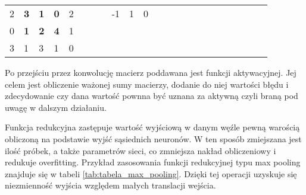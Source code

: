 \begin{table}[h]
{\begin{tabular}{lllllllllllllllllllllll}
\multicolumn{1}{|l|}{2} & \multicolumn{1}{l|}{\textbf{3}} & \multicolumn{1}{l|}{\textbf{1}} & \multicolumn{1}{l|}{\textbf{0}} & \multicolumn{1}{l|}{2} &  &  & \multicolumn{1}{l|}{} & \multicolumn{1}{l|}{-1} & \multicolumn{1}{l|}{1}  & \multicolumn{1}{l|}{0}  &  &  &                       &                         &                        &  &  &                       &                        &                         &  &  \\ \cline{1-5} \cline{9-11}
\multicolumn{1}{|l|}{0} & \multicolumn{1}{l|}{\textbf{1}} & \multicolumn{1}{l|}{\textbf{2}} & \multicolumn{1}{l|}{\textbf{4}} & \multicolumn{1}{l|}{1} &  &  &                       &                         &                         &                         &  &  &                       &                         &                        &  &  &                       &                        &                         &  &  \\ \cline{1-5}
\multicolumn{1}{|l|}{3} & \multicolumn{1}{l|}{1}          & \multicolumn{1}{l|}{3}          & \multicolumn{1}{l|}{1}          & \multicolumn{1}{l|}{0} &  &  &                       &                         &                         &                         &  &  &                       &                         &                        &  &  &                       &                        &                         &  &  \\ \cline{1-5}
\end{tabular}%
}
\label{tab:tabela_filtry_konwolucyjne}
\end{table}


Po przejściu przez konwolucję macierz poddawana jest funkcji aktywacyjnej. Jej celem jest obliczenie ważonej sumy macierzy, dodanie do niej wartości błędu i zdecydowanie czy dana wartość pownna być uznana za aktywną czyli braną pod uwagę w dalszym działaniu.

Funkcja redukcyjna zastępuje wartość wyjściową w danym węźle pewną warością obliczoną na podstawie wyjść sąsiednich neuronów. W ten sposób zmiejszana jest ilość próbek, a także parametrów sieci, co zmniejsza nakład obliczeniowy i redukuje overfitting. Przykład zasosowania funkcji redukcyjnej typu max pooling znajduje się w tabeli \ref{tab:tabela_max_pooling}. Dzięki tej operacji uzyskuje się niezmienność wyjścia względem małych translacji wejścia.

